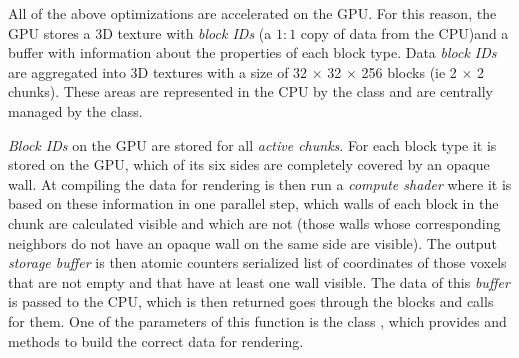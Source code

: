 All of the above optimizations are accelerated on the GPU. For this reason, the GPU stores a 3D texture with \textit{block IDs} (a $1:1$ copy of data from the CPU)and a buffer with information about the properties of each block type. Data \textit{block IDs} are aggregated into 3D textures with a size of 32 × 32 × 256 blocks (ie 2 × 2 chunks). These areas are represented in the CPU by the  class and are centrally managed by the  class.

\textit{Block IDs} on the GPU are stored for all \textit{active chunks}. For each block type
it is stored on the GPU, which of its six sides are completely covered by an opaque wall. At
compiling the data for rendering is then run a \textit{compute shader} where it is based on these information in one parallel step, which walls of each block in the chunk are calculated visible and which are not (those walls whose corresponding neighbors do not have an opaque wall on the same side are visible). The output \textit{storage buffer} is then atomic counters serialized list of coordinates of those voxels that are not empty and that have at least one wall visible. The data of this \textit{buffer} is passed to the CPU, which is then returned goes through the blocks and calls  for them. One of the parameters of this function is the class , which provides  and  methods to build the correct data for rendering.


